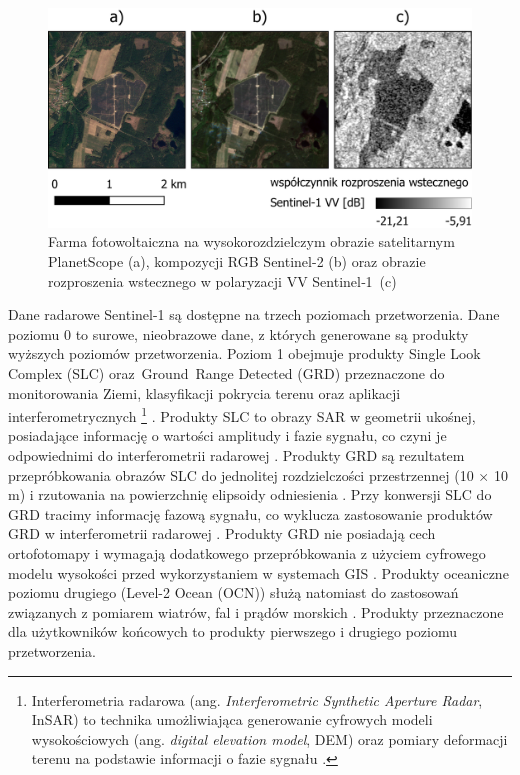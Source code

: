 \documentclass{amuthesis}
\begin{document}
\begin{figure}[t]

{\centering \includegraphics[width=1\textwidth,height=\textheight]{figures/pv_sentinel1.png}

}

\caption{\label{fig-rycina-pv-sentinel1}Farma fotowoltaiczna na
wysokorozdzielczym obrazie satelitarnym PlanetScope (a), kompozycji RGB
Sentinel-2 (b) oraz obrazie rozproszenia wstecznego w polaryzacji VV
Sentinel‑1~(c)}

\end{figure}

Dane radarowe Sentinel-1 są dostępne na trzech poziomach przetworzenia.
Dane poziomu 0 to surowe, nieobrazowe dane, z których generowane są
produkty wyższych poziomów przetworzenia. Poziom 1 obejmuje produkty
Single Look Complex (SLC) oraz~Ground~Range Detected (GRD) przeznaczone
do monitorowania Ziemi, klasyfikacji pokrycia terenu oraz aplikacji
interferometrycznych \footnote{Interferometria radarowa (ang.
  \emph{Interferometric Synthetic Aperture Radar}, InSAR) to technika
  umożliwiająca generowanie cyfrowych modeli wysokościowych (ang.
  \emph{digital elevation model}, DEM) oraz pomiary deformacji terenu na
  podstawie informacji o fazie sygnału
  \autocite{hanssen_2001_insar,hejmanowska_2020_dane}.}
\autocite{hejmanowska_2020_dane}. Produkty SLC to obrazy SAR w geometrii
ukośnej, posiadające informację o wartości amplitudy i fazie sygnału, co
czyni je odpowiednimi do interferometrii radarowej
\autocite{hejmanowska_2020_dane}. Produkty GRD są rezultatem
przepróbkowania obrazów SLC do jednolitej rozdzielczości przestrzennej
(10 × 10 m) i rzutowania na powierzchnię elipsoidy odniesienia
\autocite{hejmanowska_2020_dane}. Przy konwersji SLC do GRD tracimy
informację fazową sygnału, co wyklucza zastosowanie produktów GRD w
interferometrii radarowej \autocite{sentinel1_products}. Produkty GRD
nie posiadają cech ortofotomapy i wymagają dodatkowego przepróbkowania z
użyciem cyfrowego modelu wysokości przed wykorzystaniem w systemach GIS
\autocite{hejmanowska_2020_dane}. Produkty oceaniczne poziomu drugiego
(Level-2 Ocean (OCN)) służą natomiast do zastosowań związanych z
pomiarem wiatrów, fal i prądów morskich \autocite{sentinel1_ocn}.
Produkty przeznaczone dla użytkowników końcowych to produkty pierwszego
i drugiego poziomu przetworzenia.
\end{document}

